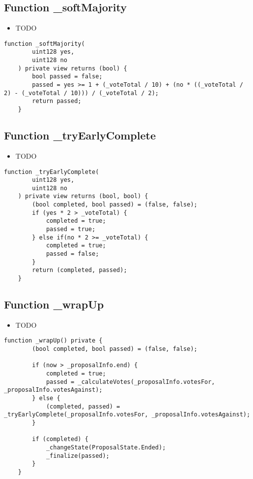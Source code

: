 \subsection{Function \_{}softMajority}

\begin{itemize}
\item TODO
\end{itemize}

\begin{lstlisting}[firstnumber=170]
    function _softMajority(
        uint128 yes,
        uint128 no
    ) private view returns (bool) {
        bool passed = false;
        passed = yes >= 1 + (_voteTotal / 10) + (no * ((_voteTotal / 2) - (_voteTotal / 10))) / (_voteTotal / 2);
        return passed;
    }
\end{lstlisting}

\subsection{Function \_{}tryEarlyComplete}

\begin{itemize}
\item TODO
\end{itemize}

\begin{lstlisting}[firstnumber=130]
    function _tryEarlyComplete(
        uint128 yes,
        uint128 no
    ) private view returns (bool, bool) {
        (bool completed, bool passed) = (false, false);
        if (yes * 2 > _voteTotal) {
            completed = true;
            passed = true;
        } else if(no * 2 >= _voteTotal) {
            completed = true;
            passed = false;
        }
        return (completed, passed);
    }
\end{lstlisting}

\subsection{Function \_{}wrapUp}

\begin{itemize}
\item TODO
\end{itemize}

\begin{lstlisting}[firstnumber=145]
    function _wrapUp() private {
        (bool completed, bool passed) = (false, false);

        if (now > _proposalInfo.end) {
            completed = true;
            passed = _calculateVotes(_proposalInfo.votesFor, _proposalInfo.votesAgainst);
        } else {
            (completed, passed) = _tryEarlyComplete(_proposalInfo.votesFor, _proposalInfo.votesAgainst);
        }

        if (completed) {
            _changeState(ProposalState.Ended);
            _finalize(passed);
        }
    }
\end{lstlisting}
